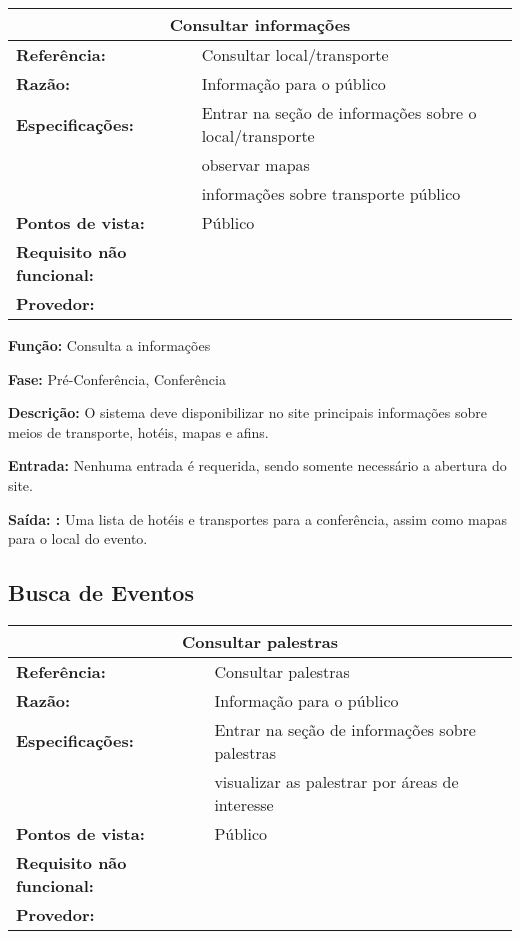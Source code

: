\documentclass[letter]{article}
\begin{document}
\begin{table}[h!]\begin{center}
\begin{tabular}{|ll|}
\hline 
\multicolumn{2}{|c|}{\textbf{Consultar informações}}\tabularnewline
\hline
\textbf{Referência:} & Consultar local/transporte\tabularnewline
\textbf{Razão:} & Informação para o público\tabularnewline
\textbf{Especificações:} & Entrar na seção de informações sobre o local/transporte\tabularnewline
 & observar mapas\tabularnewline
 & informações sobre transporte público\tabularnewline
\textbf{Pontos de vista:} & Público\tabularnewline
\textbf{Requisito não funcional:} & \tabularnewline
\textbf{Provedor:} & \tabularnewline
\hline\end{tabular}\end{center}
\end{table}

\textbf{Função:} Consulta a informações

\textbf{Fase: } Pré-Conferência, Conferência

\textbf{Descrição: } O sistema deve disponibilizar no site principais informações sobre meios de transporte, hotéis, mapas e afins.

\textbf{Entrada: } Nenhuma entrada é requerida, sendo somente necessário a abertura do site.

\textbf{Saída: :} Uma lista de hotéis e transportes para a conferência, assim como mapas para o local do evento.

\newpage
\subsection{ Busca de Eventos}

\begin{table}[h!]\begin{center}
\begin{tabular}{|ll|}
\hline 
\multicolumn{2}{|c|}{\textbf{Consultar palestras}}\tabularnewline
\hline
\textbf{Referência:} & Consultar palestras\tabularnewline
\textbf{Razão:} & Informação para o público\tabularnewline
\textbf{Especificações:} & Entrar na seção de informações sobre palestras\tabularnewline
 & visualizar as palestrar por áreas de interesse\tabularnewline
\textbf{Pontos de vista:} & Público\tabularnewline
\textbf{Requisito não funcional:} & \tabularnewline
\textbf{Provedor:} & \tabularnewline
\hline\end{tabular}\end{center}
\end{table}
\end{document}
